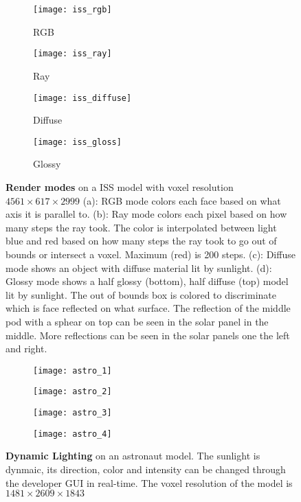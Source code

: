 \begin{figure}[H]
  \centering
  \begin{subfigure}[b]{0.48\textwidth}
    \texttt{[image: iss\_rgb]}
    \caption{RGB}
  \end{subfigure}
  \hfill
  \begin{subfigure}[b]{0.48\textwidth}
    \texttt{[image: iss\_ray]}
    \caption{Ray}
  \end{subfigure}
  \begin{subfigure}[b]{0.48\textwidth}
    \texttt{[image: iss\_diffuse]}
    \caption{Diffuse}
  \end{subfigure}
  \hfill
  \begin{subfigure}[b]{0.48\textwidth}
    \texttt{[image: iss\_gloss]}
    \caption{Glossy}
  \end{subfigure}
  \caption{\textbf{Render modes} on a ISS model with voxel resolution $4561\times617\times2999$
    (a): RGB mode colors each face based on what axis it is parallel to.
    (b): Ray mode colors each pixel based on how many steps the ray took. The color is interpolated between light blue and red based on how many steps the ray took to go out of bounds or intersect a voxel. Maximum (red) is 200 steps.
    (c): Diffuse mode shows an object with diffuse material lit by sunlight.
    (d): Glossy mode shows a half glossy (bottom), half diffuse (top) model lit by sunlight. The out of bounds box is colored to discriminate which is face reflected on what surface. The reflection of the middle pod with a sphear on top can be seen in the solar panel in the middle. More reflections can be seen in the solar panels one the left and right.
  }
  \label{rendermods}
\end{figure}


\begin{figure}[H]
  \centering
  \begin{subfigure}[b]{0.48\textwidth}
    \texttt{[image: astro\_1]}
  \end{subfigure}
  \hfill
  \begin{subfigure}[b]{0.48\textwidth}
    \texttt{[image: astro\_2]}
  \end{subfigure}
  \begin{subfigure}[b]{0.48\textwidth}
    \texttt{[image: astro\_3]}
  \end{subfigure}
  \hfill
  \begin{subfigure}[b]{0.48\textwidth}
    \texttt{[image: astro\_4]}
  \end{subfigure}
  \caption{\textbf{Dynamic Lighting} on an astronaut model. The sunlight is dynmaic, its direction, color and intensity can be changed through the developer GUI in real-time. The voxel resolution of the model is $1481\times2609\times1843$}
\end{figure}

